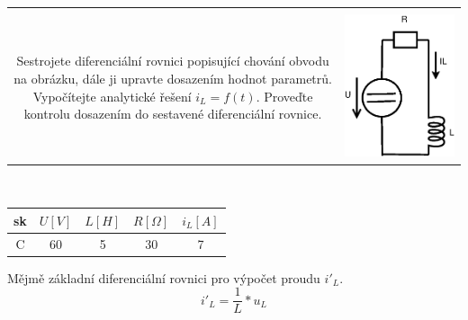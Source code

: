 \documentclass[a4paper, 12pt]{article}
\begin{document}
\begin{tabular}{c c}
    \begin{minipage}{8cm}
        .\\[-4cm]
        Sestrojete diferenciální rovnici popisující chování obvodu na obrázku, dále ji upravte dosazením hodnot parametrů. Vypočítejte analytické řešení $i_L = f(t)$. Proveďte kontrolu dosazením do sestavené diferenciální rovnice.
    \end{minipage}
    &
    \includegraphics[scale=0.5]{pr5/ee_1.eps}
\end{tabular}
\\
\begin{tabular}{|c|c|c|c|c|}
    \hline
    sk &$ U[V] $&$ L[H] $&$ R[\Omega] $&$ i_L[A] $
    \\ \hline
    C & 60 & 5 & 30 & 7 
    \\ \hline
\end{tabular}

$$ $$
Mějmě základní diferenciální rovnici pro výpočet proudu $i'_L$.
$$ i'_L = \frac{1}{L} * u_L $$
\end{document}
